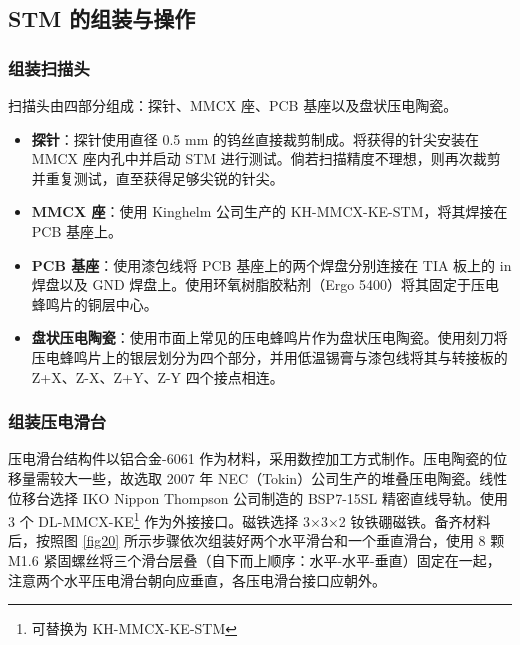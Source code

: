 \documentclass{article}
\begin{document}
\begin{spacing}{1.625}
	
	
	
	
	
	\subsection{STM 的组装与操作}
	\subsubsection{组装扫描头}
	扫描头由四部分组成：探针、MMCX 座、PCB 基座以及盘状压电陶瓷。
	\begin{itemize}
		\item \textbf{探针}：探针使用直径 0.5 mm 的钨丝直接裁剪制成。将获得的针尖安装在 MMCX 座内孔中并启动 STM 进行测试。倘若扫描精度不理想，则再次裁剪并重复测试，直至获得足够尖锐的针尖。
		
		\item \textbf{MMCX 座}：使用 Kinghelm 公司生产的 KH-MMCX-KE-STM，将其焊接在 PCB 基座上。
		
		\item \textbf{PCB 基座}：使用漆包线将 PCB 基座上的两个焊盘分别连接在 TIA 板上的 in 焊盘以及 GND 焊盘上。使用环氧树脂胶粘剂（Ergo 5400）将其固定于压电蜂鸣片的铜层中心。
		
		\item \textbf{盘状压电陶瓷}：使用市面上常见的压电蜂鸣片作为盘状压电陶瓷。使用刻刀将压电蜂鸣片上的银层划分为四个部分，并用低温锡膏与漆包线将其与转接板的 Z+X、Z-X、Z+Y、Z-Y 四个接点相连。
		
	\end{itemize}
	
	
	
	
	
	
	
	\subsubsection{组装压电滑台}
	压电滑台结构件以铝合金-6061 作为材料，采用数控加工方式制作。压电陶瓷的位移量需较大一些，故选取 2007 年 NEC（Tokin）公司生产的堆叠压电陶瓷。线性位移台选择 IKO Nippon Thompson 公司制造的 BSP7-15SL 精密直线导轨。使用 3 个 DL-MMCX-KE\footnote{可替换为 KH-MMCX-KE-STM} 作为外接接口。磁铁选择 3$\times$3$\times$2 钕铁硼磁铁。备齐材料后，按照图 \ref{fig20} 所示步骤依次组装好两个水平滑台和一个垂直滑台，使用 8 颗 M1.6 紧固螺丝将三个滑台层叠（自下而上顺序：水平-水平-垂直）固定在一起，注意两个水平压电滑台朝向应垂直，各压电滑台接口应朝外。
	

\end{spacing}
\end{document}
